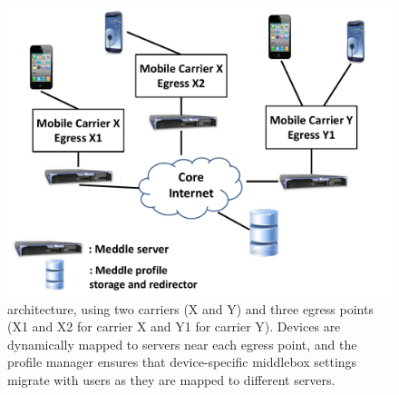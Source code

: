 \begin{figure}
\centering
        \includegraphics[width=0.8\linewidth]{figs/architecture.pdf}
\vspace{\figcapspace}
  \caption{\meddle architecture, using two carriers (X and Y) and 
  three egress points (X1 and X2 for carrier X and Y1 for carrier Y). 
  Devices are dynamically mapped to \meddle servers near each egress point, 
  and the profile manager ensures that device-specific middlebox settings 
  migrate with users as they are mapped to different \meddle servers.}
  \label{fig:arch}
\vspace{\postfigspace}
\end{figure}





